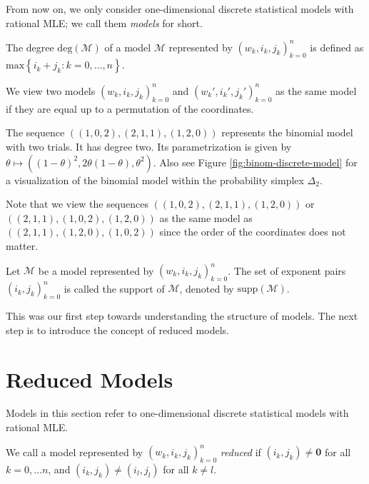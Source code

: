 From now on, we only consider one-dimensional discrete statistical models with rational MLE; we call them \emph{models} for short.

\begin{definition}
    The degree \( \mathrm{deg}(\mathcal{M}) \) of a model \( \mathcal{M} \) represented by \( (w_k, i_k, j_k)_{k=0}^n \) is defined as \( \mathrm{max}\left\{ i_k + j_k : k = 0, \dots, n \right\} \).
\end{definition}

\begin{remark}\label{rem:equivalent-models}
    We view two models \( (w_k,i_k,j_k)_{k=0}^n \) and \( (w_k',i_k',j_k')_{k=0}^n \) as the same model if they are equal up to a permutation of the coordinates.
\end{remark}

\begin{example}
    The sequence \( ((1,0,2), (2,1,1), (1,2,0)) \) represents the binomial model with two trials. It has degree two. Its parametrization is given by \( \theta \mapsto ((1-\theta)^2, 2\theta(1-\theta),\theta^2) \). Also see Figure \ref{fig:binom-discrete-model} for a visualization of the binomial model within the probability simplex \( \Delta_2 \).

    Note that we view the sequences \( ((1,0,2), (2,1,1), (1,2,0)) \) or \( ((2,1,1), (1,0,2), (1,2,0)) \) as the same model as \( ((2,1,1), (1,2,0), (1,0,2)) \) since the order of the coordinates does not matter.
\end{example}

\begin{definition}
    Let \( \mathcal{M} \) be a model represented by \( (w_k, i_k, j_k)_{k=0}^n \). The set of exponent pairs \( (i_k, j_k)_{k=0}^n \) is called the support of \( \mathcal{M} \), denoted by \( \mathrm{supp}(\mathcal{M}) \).
\end{definition}

This was our first step towards understanding the structure of models. The next step is to introduce the concept of reduced models.

\section{Reduced Models}

Models in this section refer to one-dimensional discrete statistical models with rational MLE.

\begin{definition}
    We call a model represented by \( (w_k, i_k, j_k)_{k=0}^n \) \emph{reduced} if \( (i_k, j_k) \neq \mathbf 0 \) for all \( k = 0, \dots n \), and \( (i_k, j_k) \neq (i_l, j_l) \) for all \( k \neq l \).
\end{definition}


